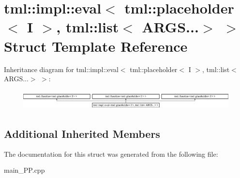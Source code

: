 \hypertarget{structtml_1_1impl_1_1eval_3_01tml_1_1placeholder_3_01I_01_4_00_01tml_1_1list_3_01ARGS_8_8_8_4_01_4}{\section{tml\+:\+:impl\+:\+:eval$<$ tml\+:\+:placeholder$<$ I $>$, tml\+:\+:list$<$ A\+R\+G\+S...$>$ $>$ Struct Template Reference}
\label{structtml_1_1impl_1_1eval_3_01tml_1_1placeholder_3_01I_01_4_00_01tml_1_1list_3_01ARGS_8_8_8_4_01_4}
}
Inheritance diagram for tml\+:\+:impl\+:\+:eval$<$ tml\+:\+:placeholder$<$ I $>$, tml\+:\+:list$<$ A\+R\+G\+S...$>$ $>$\+:\begin{figure}[H]
\begin{center}
\leavevmode
\includegraphics[height=1.091618cm]{structtml_1_1impl_1_1eval_3_01tml_1_1placeholder_3_01I_01_4_00_01tml_1_1list_3_01ARGS_8_8_8_4_01_4}
\end{center}
\end{figure}
\subsection*{Additional Inherited Members}


The documentation for this struct was generated from the following file\+:\begin{DoxyCompactItemize}
\item 
main\+\_\+\+P\+P.\+cpp\end{DoxyCompactItemize}
